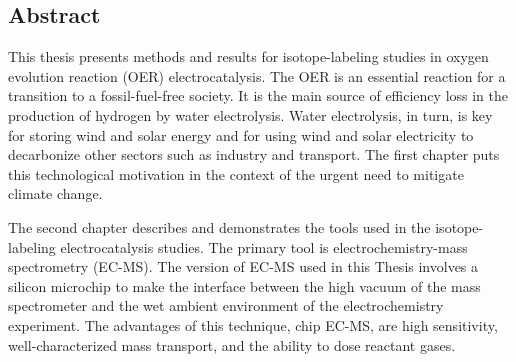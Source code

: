 
\begin{adjustwidth}{1cm}{1cm}

\chapter*{Abstract}

This thesis presents methods and results for isotope-labeling studies in oxygen evolution reaction (OER) electrocatalysis. The OER is an essential reaction for a transition to a fossil-fuel-free society. It is the main source of efficiency loss in the production of hydrogen by water electrolysis. Water electrolysis, in turn, is key for storing wind and solar energy and for using wind and solar electricity to decarbonize other sectors such as industry and transport. The first chapter puts this technological motivation in the context of the urgent need to mitigate climate change.

The second chapter describes and demonstrates the tools used in the isotope-labeling electrocatalysis studies. The primary tool is electrochemistry-mass spectrometry (EC-MS). The version of EC-MS used in this Thesis involves a silicon microchip to make the interface between the high vacuum of the mass spectrometer and the wet ambient environment of the electrochemistry experiment. The advantages of this technique, chip EC-MS, are high sensitivity, well-characterized mass transport, and the ability to dose reactant gases. 


\end{adjustwidth}
